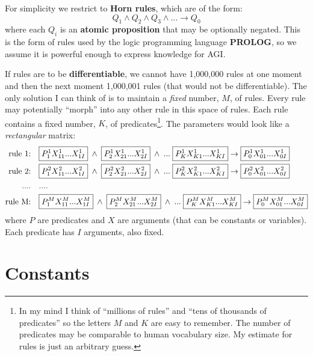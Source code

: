 For simplicity we restrict to \textbf{Horn rules}, which are of the form:
\begin{equation}
Q_1 \wedge Q_2 \wedge Q_3 \wedge ... \rightarrow Q_0
\end{equation}
where each $Q_i$ is an \textbf{atomic proposition} that may be optionally negated.  This is the form of rules used by the logic programming language \textbf{PROLOG}, so we assume it is powerful enough to express knowledge for AGI.

If rules are to be \textbf{differentiable}, we cannot have 1,000,000 rules at one moment and then the next moment 1,000,001 rules (that would not be differentiable).  The only solution I can think of is to maintain a \textit{fixed} number, $M$, of rules.  Every rule may potentially ``morph'' into any other rule in this space of rules.  Each rule contains a fixed number, $K$, of predicates\footnote{In my mind I think of ``millions of rules'' and ``tens of thousands of predicates'' so the letters $M$ and $K$ are easy to remember.  The number of predicates may be comparable to human vocabulary size.  My estimate for rules is just an arbitrary guess.}.  The parameters would look like a \textit{rectangular} matrix:
\begin{equation}
\begin{aligned}
	\mbox{rule 1:} & \quad \boxed{P^1_{1} X^1_{11}... X^1_{1I}} \;\wedge\; \boxed{P^1_2 X^1_{21} ... X^1_{2I}} \;\wedge\;...\; \boxed{P^1_K X^1_{K1} ... X^1_{KI}} \rightarrow \boxed{P^1_0 X^1_{01} ... X^1_{0I}} \\
	\mbox{rule 2:} & \quad \boxed{P^2_{1} X^2_{11}... X^2_{1I}} \;\wedge\; \boxed{P^2_2 X^2_{21} ... X^2_{2I}} \;\wedge\;...\; \boxed{P^2_K X^2_{K1} ... X^2_{KI}} \rightarrow \boxed{P^2_0 X^2_{01} ... X^2_{0I}} \\
	.... & \quad .... \\
	\mbox{rule M:} & \quad \boxed{P^M_{1} X^M_{11}... X^M_{1I}} \;\wedge\; \boxed{P^M_2 X^M_{21} ... X^M_{2I}} \;\wedge\;...\; \boxed{P^M_K X^M_{K1} ... X^M_{KI}} \rightarrow \boxed{P^M_0 X^M_{01} ... X^M_{0I}}
	\raisetag{20pt}
\end{aligned}
\end{equation}
where $P$ are predicates and $X$ are arguments (that can be constants or variables).  Each predicate has $I$ arguments, also fixed.

\section{Constants}

